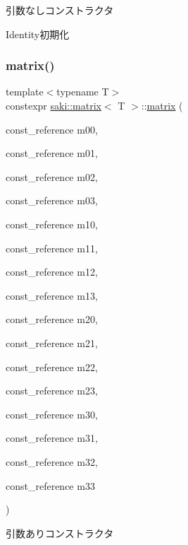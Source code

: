 引数なしコンストラクタ 

Identity初期化 \mbox{\label{classsaki_1_1matrix_a55edebaa14a4a0ea6b6f263ebe9950f4}} 
\subsubsection{\texorpdfstring{matrix()}{matrix()}\hspace{0.1cm}{\footnotesize\ttfamily [2/6]}}
{\footnotesize\ttfamily template$<$typename T$>$ \\
constexpr \mbox{\hyperlink{classsaki_1_1matrix}{saki\+::matrix}}$<$ T $>$\+::\mbox{\hyperlink{classsaki_1_1matrix}{matrix}} (\begin{DoxyParamCaption}\item[{const\+\_\+reference}]{m00,  }\item[{const\+\_\+reference}]{m01,  }\item[{const\+\_\+reference}]{m02,  }\item[{const\+\_\+reference}]{m03,  }\item[{const\+\_\+reference}]{m10,  }\item[{const\+\_\+reference}]{m11,  }\item[{const\+\_\+reference}]{m12,  }\item[{const\+\_\+reference}]{m13,  }\item[{const\+\_\+reference}]{m20,  }\item[{const\+\_\+reference}]{m21,  }\item[{const\+\_\+reference}]{m22,  }\item[{const\+\_\+reference}]{m23,  }\item[{const\+\_\+reference}]{m30,  }\item[{const\+\_\+reference}]{m31,  }\item[{const\+\_\+reference}]{m32,  }\item[{const\+\_\+reference}]{m33 }\end{DoxyParamCaption})\hspace{0.3cm}{\ttfamily [inline]}}



引数ありコンストラクタ 

\mbox{\label{classsaki_1_1matrix_aadbe6027fea1fecafc641cd553855408}} 
